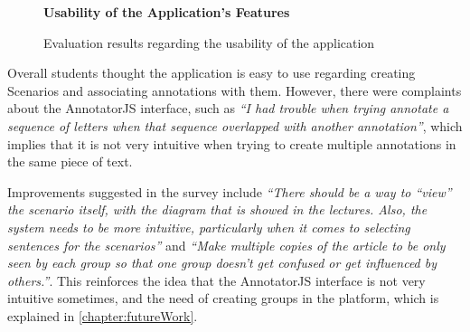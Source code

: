 \begin{figure}[h]
\centering
\begin{normalsize}
\textbf{Usability of the Application's Features}\\
\end{normalsize}
\scriptsize
{}
\caption{Evaluation results regarding the usability of the application}
\label{figure:usabilityEvaluation}
\end{figure}

Overall students thought the application is easy to use regarding creating Scenarios and associating annotations with them. However, there were complaints about the AnnotatorJS interface, such as \textit{``I had trouble when trying annotate a sequence of letters when that sequence overlapped with another annotation''}, which implies that it is not very intuitive when trying to create multiple annotations in the same piece of text.

Improvements suggested in the survey include \textit{``There should be a way to ``view'' the scenario itself, with the diagram that is showed in the lectures. Also, the system needs to be more intuitive, particularly when it comes to selecting sentences for the scenarios''} and \textit{``Make multiple copies of the article to be only seen by each group so that one group doesn't get confused or get influenced by others.''}. This reinforces the idea that the AnnotatorJS interface is not very intuitive sometimes, and the need of creating groups in the platform, which is explained in \ref{chapter:futureWork}.

